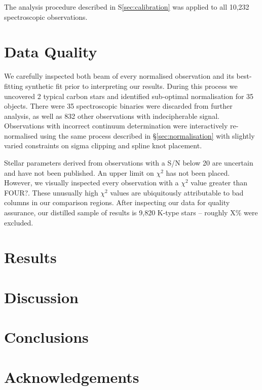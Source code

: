 \documentclass{emulateapj}
\begin{document}
The analysis procedure described in S\ref{sec:calibration} was applied to all 10,232 spectroscopic observations.



\section{Data Quality}

We carefully inspected both beam of every normalised observation and its best-fitting synthetic fit prior to interpreting our results. During this process we uncovered 2 typical carbon stars and identified sub-optimal normalisation for 35 objects. There were 35 spectroscopic binaries were discarded from further analysis, as well as 832 other observations with indecipherable signal. Observations with incorrect continuum determination were  interactively re-normalised using the same process described in \S\ref{sec:normalisation} with slightly varied constraints on sigma clipping and spline knot placement.


Stellar parameters derived from observations with a S/N below 20 are uncertain and have not been published. An upper limit on $\chi^2$ has not been placed. However, we visually inspected every observation with a $\chi^2$ value greater than FOUR?. These unusually high $\chi^2$ values are ubiquitously attributable to bad columns in our comparison regions. After inspecting our data for quality assurance, our distilled sample of results is 9,820 K-type stars \--- roughly X\% were excluded.


\section{Results}
\label{sec:results}



\section{Discussion}
\label{sec:discussion}


\section{Conclusions}
\label{sec:conclusions}

\section{Acknowledgements}
\label{sec:acknowledgements}
\end{document}
